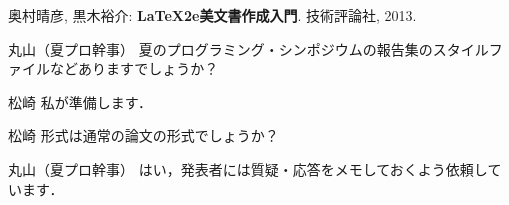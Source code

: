 \documentclass{ipsjprosym}
\begin{document}
\begin{thebibliography}{9}
  奥村晴彦, 黒木裕介: \textbf{LaTeX2e美文書作成入門}. 技術評論社, 2013.
\end{thebibliography}

\begin{QandA}
\item[丸山（夏プロ幹事）] 夏のプログラミング・シンポジウムの報告集のスタイルファイルなどありますでしょうか？
\item[松崎] 私が準備します．
\item[松崎] 形式は通常の論文の形式でしょうか？
\item[丸山（夏プロ幹事）] はい，発表者には質疑・応答をメモしておくよう依頼しています．
\end{QandA}
\end{document}
